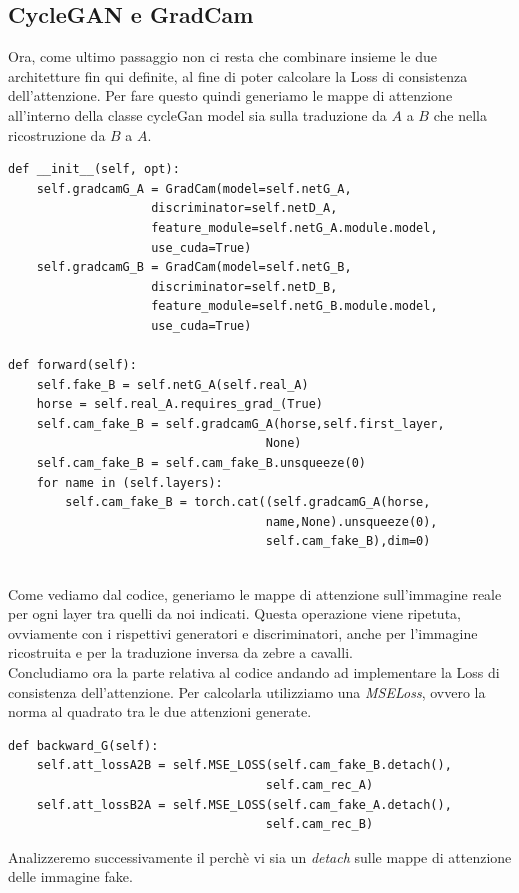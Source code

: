 \subsection{CycleGAN e GradCam}
Ora, come ultimo passaggio non ci resta che combinare insieme le due architetture fin qui definite, al fine di poter calcolare la Loss di consistenza dell'attenzione. Per fare questo quindi generiamo le mappe di attenzione all'interno della classe cycleGan model sia sulla traduzione da $A$ a $B$ che nella ricostruzione da $B$ a $A$. 
\begin{verbatim}
def __init__(self, opt):
    self.gradcamG_A = GradCam(model=self.netG_A,
                    discriminator=self.netD_A,
                    feature_module=self.netG_A.module.model,
                    use_cuda=True)
    self.gradcamG_B = GradCam(model=self.netG_B,
                    discriminator=self.netD_B,
                    feature_module=self.netG_B.module.model,
                    use_cuda=True)
    
def forward(self):
    self.fake_B = self.netG_A(self.real_A)
    horse = self.real_A.requires_grad_(True)   
    self.cam_fake_B = self.gradcamG_A(horse,self.first_layer,
                                    None)
    self.cam_fake_B = self.cam_fake_B.unsqueeze(0)
    for name in (self.layers):
        self.cam_fake_B = torch.cat((self.gradcamG_A(horse,
                                    name,None).unsqueeze(0),
                                    self.cam_fake_B),dim=0)
    
\end{verbatim}
Come vediamo dal codice, generiamo le mappe di attenzione sull'immagine reale per ogni layer tra quelli da noi indicati. Questa operazione viene ripetuta, ovviamente con i rispettivi generatori e discriminatori, anche per l'immagine ricostruita e per la traduzione inversa da zebre a cavalli.
\\Concludiamo ora la parte relativa al codice andando ad implementare la Loss di consistenza dell'attenzione. Per calcolarla utilizziamo una \emph{MSELoss}, ovvero la norma al quadrato tra le due attenzioni generate.
\begin{verbatim}
def backward_G(self):
    self.att_lossA2B = self.MSE_LOSS(self.cam_fake_B.detach(),
                                    self.cam_rec_A)
    self.att_lossB2A = self.MSE_LOSS(self.cam_fake_A.detach(),
                                    self.cam_rec_B)
\end{verbatim}
Analizzeremo successivamente il perchè vi sia un \emph{detach} sulle mappe di attenzione delle immagine fake.